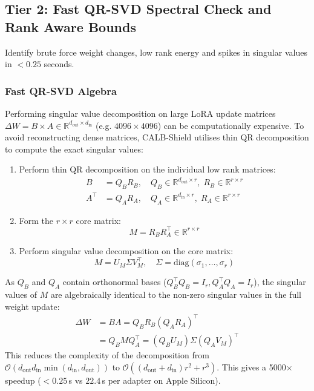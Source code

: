 \documentclass[conference]{IEEEtran}
\begin{document}
\subsection{Tier 2: Fast QR-SVD Spectral Check and Rank Aware Bounds}
\label{subsec:tier2}

Identify brute force weight changes, low rank energy and spikes in singular values in $< 0.25$ seconds.

\subsubsection{Fast QR-SVD Algebra}
Performing singular value decomposition on large LoRA update matrices $\Delta W = B \times A \in \mathbb{R}^{d_{\text{out}} \times d_{\text{in}}}$ (e.g. $4096 \times 4096$) can be computationally expensive. To avoid reconstructing dense matrices, CALB-Shield utilises thin QR decomposition to compute the exact singular values:
\begin{enumerate}
    \item Perform thin QR decomposition on the individual low rank matrices:
    \begin{align}
    B &= Q_B R_B, \quad Q_B \in \mathbb{R}^{d_{\text{out}} \times r}, \; R_B \in \mathbb{R}^{r \times r} \\
    A^\top &= Q_A R_A, \quad Q_A \in \mathbb{R}^{d_{\text{in}} \times r}, \; R_A \in \mathbb{R}^{r \times r}
    \end{align}
    \item Form the $r \times r$ core matrix:
    \begin{equation}
    M = R_B R_A^\top \in \mathbb{R}^{r \times r}
    \end{equation}
    \item Perform singular value decomposition on the core matrix:
    \begin{equation}
    M = U_M \Sigma V_M^\top, \quad \Sigma = \text{diag}(\sigma_1, \dots, \sigma_r)
    \end{equation}
\end{enumerate}
As $Q_B$ and $Q_A$ contain orthonormal bases ($Q_B^\top Q_B = I_r, Q_A^\top Q_A = I_r$), the singular values of $M$ are algebraically identical to the non-zero singular values in the full weight update:
\begin{align}
\Delta W &= B A = Q_B R_B (Q_A R_A)^\top \nonumber \\
&= Q_B M Q_A^\top = (Q_B U_M) \Sigma (Q_A V_M)^\top
\end{align}
This reduces the complexity of the decomposition from $\mathcal{O}(d_{\text{out}} d_{\text{in}} \min(d_{\text{in}}, d_{\text{out}}))$ to $\mathcal{O}((d_{\text{out}} + d_{\text{in}}) r^2 + r^3)$. This gives a 5000$\times$ speedup ($< 0.25$\,s vs $22.4$\,s per adapter on Apple Silicon).
\end{document}
